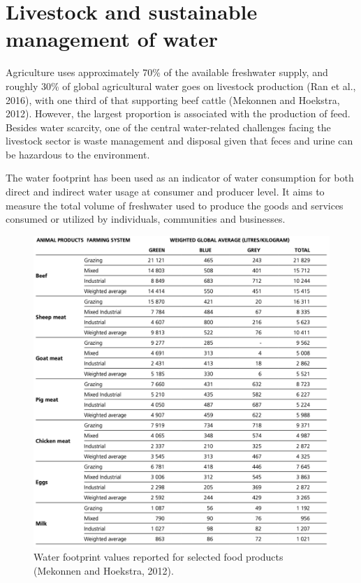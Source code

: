 \documentclass[]{book}
\begin{document}
\hypertarget{livestock-and-sustainable-management-of-water}{%
\section{Livestock and sustainable management of water}\label{livestock-and-sustainable-management-of-water}}

Agriculture uses approximately 70\% of the available freshwater supply, and roughly 30\% of global agricultural water goes on livestock production (Ran et al., 2016), with one third of that supporting beef cattle (Mekonnen and Hoekstra, 2012). However, the largest proportion is associated with the production of feed. Besides water scarcity, one of the central water-related challenges facing the livestock sector is waste management and disposal given that feces and urine can be hazardous to the environment.

The water footprint has been used as an indicator of water consumption for both direct and indirect water usage at consumer and producer level. It aims to measure the total volume of freshwater used to produce the goods and services consumed or utilized by individuals, communities and businesses.

\begin{figure}

{\centering \includegraphics[width=1\linewidth]{figures/water-footprint} 

}

\caption{Water footprint values reported for selected food products (Mekonnen and Hoekstra, 2012).}\label{fig:water-footprint}
\end{figure}
\end{document}
